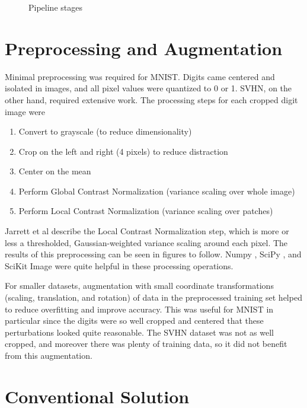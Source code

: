 \documentclass{article}
\begin{document}
\begin{figure}[htbp]
  \centering
  
  \caption{Pipeline stages}
  \label{fig:pipeline}
\end{figure}

\section{Preprocessing and Augmentation}

Minimal preprocessing was required for MNIST. Digits came centered and isolated in images, and all pixel values were quantized to 0 or 1. SVHN, on the other hand, required extensive work. The processing steps for each cropped digit image were

\begin{enumerate}
  \item Convert to grayscale (to reduce dimensionality)
  \item Crop on the left and right (4 pixels) to reduce distraction
  \item Center on the mean
  \item Perform Global Contrast Normalization (variance scaling over whole image)
  \item Perform Local Contrast Normalization (variance scaling over patches)
\end{enumerate}

Jarrett et al \cite{jarrett2009best} describe the Local Contrast Normalization step, which is more or less a thresholded, Gaussian-weighted variance scaling around each pixel. The results of this preprocessing can be seen in figures to follow. Numpy \cite{van2011numpy}, SciPy \cite{scipy}, and SciKit Image \cite{van2014scikit} were quite helpful in these processing operations.

For smaller datasets, augmentation with small coordinate transformations (scaling, translation, and rotation) of data in the preprocessed training set helped to reduce overfitting and improve accuracy. This was useful for MNIST in particular since the digits were so well cropped and centered that these perturbations looked quite reasonable. The SVHN dataset was not as well cropped, and moreover there was plenty of training data, so it did not benefit from this augmentation.

\section{Conventional Solution}
\end{document}
